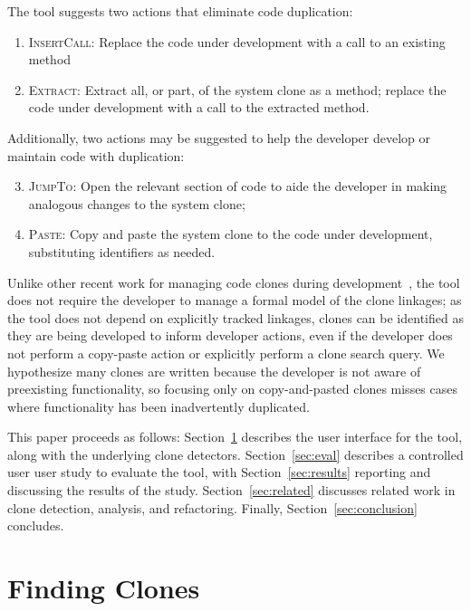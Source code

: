 \documentclass[nocopyrightspace,10pt]{sigplanconf}
\begin{document}
The tool suggests two actions that eliminate code duplication:

\begin{enumerate}
  \item \textsc{InsertCall}: Replace the code under development with a call to an existing method
  \item \textsc{Extract}: Extract all, or part, of the system clone as a method;
    replace the code under development with a call to the extracted
    method.
\end{enumerate}

\noindent Additionally, two actions may be suggested to help the developer
develop or maintain code with duplication:

\begin{enumerate}
\setcounter{enumi}{2}
  \item \textsc{JumpTo}: Open the relevant section of code to aide the
    developer in making analogous changes to the system clone;
  \item \textsc{Paste}: Copy and paste the system clone to the code under development,
    substituting identifiers as needed.
\end{enumerate}

Unlike other recent work for managing code clones during
development~\cite{deWit2009, Duala-Ekoko2007}, the tool does not
require the developer to manage a formal model of the clone linkages;
as the tool does not depend on explicitly tracked linkages, clones can
be identified as they are being developed to inform developer actions,
even if the developer does not perform a copy-paste action or
explicitly perform a clone search query.  We hypothesize many clones 
are written because the developer is not aware of preexisting functionality,
 so focusing only on copy-and-pasted clones
misses cases where functionality has been inadvertently 
duplicated.

This paper proceeds as follows: Section~\ref{sec:finding-clones}
describes the user interface for the tool, along with the underlying
clone detectors. Section~\ref{sec:eval} describes a controlled user
user study to evaluate the tool, with Section~\ref{sec:results}
reporting and discussing the results of the study.
Section~\ref{sec:related} discusses
related work in clone detection, analysis, and refactoring. Finally,
Section~\ref{sec:conclusion} concludes.

\section{Finding Clones}
\label{sec:finding-clones}
\end{document}
